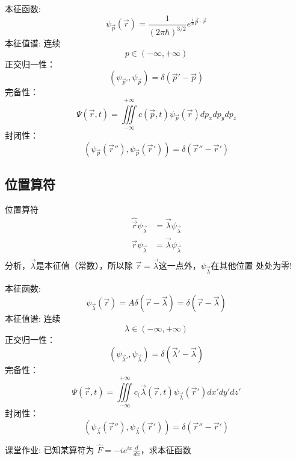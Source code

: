 \begin{frame} 
    本征函数: $$ \psi_{\vec{p}}(\vec{r})=\frac{1}{(2\pi\hbar)^{3/2}}e^{\frac{i}{\hbar}\vec{p}\cdot \vec{r}}   $$
    本征值谱: 连续
        $$ p \in (-\infty, +\infty) $$
    正交归一性：
        $$ (\psi_{\vec{p}'}, \psi_{\vec{p}}) =\delta(\vec{p}'-\vec{p})$$
    完备性：
    $$ \Psi(\vec{r},t)=\iiint\limits_{-\infty}^{+\infty}c(\vec{p},t) \psi_{\vec{p}}(\vec{r}) dp_xdp_ydp_z $$
    封闭性：$$ (\psi_{\vec{p}}(\vec{r}''), \psi_{\vec{p}}(\vec{r}')) =\delta(\vec{r}''-\vec{r}')$$
\end{frame} 

\subsection{位置算符}

\begin{frame} {位置算符}
    \例[9.求解位置算符本征方程]{  
    \[\hat{\vec r}\psi_{\vec \lambda}=\vec \lambda \psi_{\vec \lambda}\]}   
    \解~  
    \begin{equation*}
        \begin{split}
            \hat{\vec r}\psi_{\vec \lambda}&=\vec \lambda \psi_{\vec \lambda} \\
            \vec{r}\psi_{\vec \lambda}&=\vec \lambda \psi_{\vec \lambda} \\
        \end{split} 
    \end{equation*}
    分析，$\vec \lambda$是本征值（常数），所以除 $\vec r =\vec \lambda $这一点外，$\psi_{\vec \lambda}$在其他位置
    处处为零!\\
\end{frame} 

\begin{frame} 
    本征函数: $$ \psi_{\vec \lambda}(\vec{r})= A \delta(\vec{r}-\vec{\lambda})= \delta(\vec{r}-\vec{\lambda})$$
    本征值谱: 连续
        $$ \lambda \in (-\infty, +\infty) $$
    正交归一性：
        $$ (\psi_{\vec{\lambda}'}, \psi_{\vec{\lambda}}) =\delta(\vec{\lambda}'-\vec{\lambda})$$
    完备性：
    $$ \Psi(\vec{r},t)=\iiint\limits_{-\infty}^{+\infty}c_(\vec{\lambda}(\vec{r},t) \psi_{\vec{\lambda}}(\vec{r}') dx'dy'dz' $$
    封闭性：$$ (\psi_{\vec{\lambda}}(\vec{r}''), \psi_{\vec{\lambda}}(\vec{r}')) =\delta(\vec{r}''-\vec{r}')$$
\end{frame} 

\begin{frame}
    \begin{atcbox}{课堂作业:}
        已知某算符为  $\hat{F}=-ie^{ix}\frac{d}{dx}$，求本征函数 \\  
     \end{atcbox}
\end{frame} 

